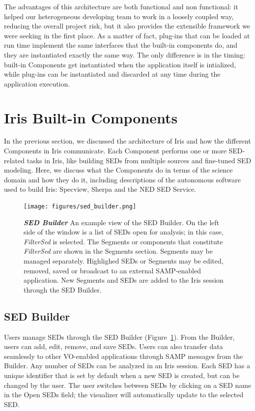 \documentclass[final,5p]{elsarticle}
\begin{document}
The advantages of this architecture are both functional and non functional: it helped our heterogeneous developing team to work in a loosely coupled way, reducing the overall project risk, but it also provides the extensible framework we were seeking in the first place. As a matter of fact, plug-ins that can be loaded at run time implement the same interfaces that the built-in components do, and they are instantiated exactly the same way. The only difference is in the timing: built-in Components get instantiated when the application itself is intialized, while plug-ins can be instantiated and discarded at any time during the application execution.

\section{Iris Built-in Components}
\label{sec:components}

In the previous section, we discussed the architecture of Iris and how the different Components in Iris communicate. Each Component performs one or more SED-related tasks in Iris, like building SEDs from multiple sources and fine-tuned SED modeling.  Here, we discuss what the Components do in terms of the science domain and how they do it, including descriptions of the autonomous software used to build Iris: Specview, Sherpa and the NED SED Service.

\begin{figure}
\begin{center}
\texttt{[image: figures/sed\_builder.png]}
\caption{\textit{\textbf{\label{fig:sed_builder} SED Builder}} An example view of the SED Builder. On the left side of the window is a list of SEDs open for analysis; in this case, \textit{FilterSed} is selected. The Segments or components that constitute \textit{FilterSed} are shown in the Segments section. Segments may be managed separately. Highlighed SEDs or Segments may be edited, removed, saved or broadcast to an external SAMP-enabled application. New Segments and SEDs are added to the Iris session through the SED Builder. }
\end{center}
\end{figure}

\subsection{SED Builder}

Users manage SEDs through the SED Builder (Figure~\ref{fig:sed_builder}). From the Builder, users can add, edit, remove, and save SEDs. Users can also transfer data seamlessly to other VO-enabled applications through SAMP messages from the Builder. Any number of SEDs can be analyzed in an Iris session. Each SED has a unique identifier that is set by default when a new SED is created, but can be changed by the user. The user switches between SEDs by clicking on a SED name in the Open SEDs field; the visualizer will automatically update to the selected SED.
\end{document}
